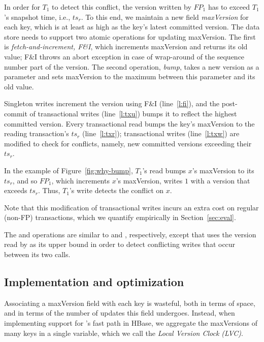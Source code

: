 In order for $T_1$ to detect this 
conflict, the version written by $FP_1$ has to exceed $T_1$'s snapshot time, i.e., $ts_r$.
To this end, we maintain a new field \emph{maxVersion} for each key, which is at least as 
high as the key's latest committed version. 
The data store needs to support two atomic operations for updating {maxVersion}.
The first is \emph{fetch-and-increment, F\&I}, which increments {maxVersion} and returns its
old value; F\&I throws an abort exception in case of wrap-around of the 
sequence number part  of  the version. 
The second operation, \emph{bump}, takes a new version  as a parameter and
sets  {maxVersion} to the maximum between this parameter and its old value.

Singleton writes  increment the version using F\&I  (line~\ref{l:fi}), and  
the post-commit of transactional writes  (line~\ref{l:txu}) bumps it 
to reflect the highest committed version.
Every transactional read bumps the key's {maxVersion}
to the reading transaction's $ts_r$  (line~\ref{l:txr}); 
transactional writes (line~\ref{l:txw}) are modified to check for conflicts, namely, 
new committed versions exceeding their $ts_r$.

In the example of Figure~\ref{fig:why-bump}, $T_1$'s read bumps $x$'s {maxVersion} to its $ts_r$, 
and so $FP_1$, which increments $x$'s maxVersion, writes $1$ with a version that exceeds $ts_r$.
Thus, $T_1$'s write  detects the conflict on $x$. 

 Note that this modification of transactional writes incurs an extra cost on
 regular (non-FP) transactions, which we quantify empirically in Section~\ref{sec:eval}.  

The  and  operations are  similar to  and , 
respectively, except that  uses the version read by  as its upper bound
in order to detect conflicting writes that occur between its two calls.

\subsection{Implementation and optimization}
\label{ssec:fast-impl}

Associating a maxVersion field with each key is wasteful,
both in terms of space, and in terms of the number of updates this field undergoes.
Instead, when implementing support for \sys's fast path in HBase, we aggregate the maxVersions of many keys in a single variable, 
which we call the \emph{Local Version Clock (LVC)}.

